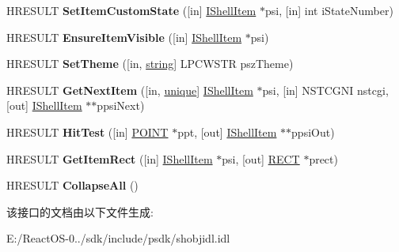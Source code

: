 \begin{DoxyCompactItemize}
\item 
\mbox{\label{interface_i_name_space_tree_control_a7b407539cedfba7dcdef18b0580801e9}} 
H\+R\+E\+S\+U\+LT {\bfseries Set\+Item\+Custom\+State} (\mbox{[}in\mbox{]} \hyperlink{interface_i_shell_item}{I\+Shell\+Item} $\ast$psi, \mbox{[}in\mbox{]} int i\+State\+Number)
\item 
\mbox{\label{interface_i_name_space_tree_control_a92fd1a0ce5f82459c0abe6a3a7b8f928}} 
H\+R\+E\+S\+U\+LT {\bfseries Ensure\+Item\+Visible} (\mbox{[}in\mbox{]} \hyperlink{interface_i_shell_item}{I\+Shell\+Item} $\ast$psi)
\item 
\mbox{\label{interface_i_name_space_tree_control_a00c821700f0ced829b4efab13bb7a442}} 
H\+R\+E\+S\+U\+LT {\bfseries Set\+Theme} (\mbox{[}in, \hyperlink{structstring}{string}\mbox{]} L\+P\+C\+W\+S\+TR psz\+Theme)
\item 
\mbox{\label{interface_i_name_space_tree_control_ad71c0f60cacccd7dec8f88dcf53eaa60}} 
H\+R\+E\+S\+U\+LT {\bfseries Get\+Next\+Item} (\mbox{[}in, \hyperlink{interfaceunique}{unique}\mbox{]} \hyperlink{interface_i_shell_item}{I\+Shell\+Item} $\ast$psi, \mbox{[}in\mbox{]} N\+S\+T\+C\+G\+NI nstcgi, \mbox{[}out\mbox{]} \hyperlink{interface_i_shell_item}{I\+Shell\+Item} $\ast$$\ast$ppsi\+Next)
\item 
\mbox{\label{interface_i_name_space_tree_control_ab09cfaf7016e1fdcd4a8ddcb13549e12}} 
H\+R\+E\+S\+U\+LT {\bfseries Hit\+Test} (\mbox{[}in\mbox{]} \hyperlink{structtag_p_o_i_n_t}{P\+O\+I\+NT} $\ast$ppt, \mbox{[}out\mbox{]} \hyperlink{interface_i_shell_item}{I\+Shell\+Item} $\ast$$\ast$ppsi\+Out)
\item 
\mbox{\label{interface_i_name_space_tree_control_a0fb8d856ce2b86ee4608c8629473d05f}} 
H\+R\+E\+S\+U\+LT {\bfseries Get\+Item\+Rect} (\mbox{[}in\mbox{]} \hyperlink{interface_i_shell_item}{I\+Shell\+Item} $\ast$psi, \mbox{[}out\mbox{]} \hyperlink{structtag_r_e_c_t}{R\+E\+CT} $\ast$prect)
\item 
\mbox{\label{interface_i_name_space_tree_control_a78fa1be38d45ab12bc72f7990b2c791d}} 
H\+R\+E\+S\+U\+LT {\bfseries Collapse\+All} ()
\end{DoxyCompactItemize}


该接口的文档由以下文件生成\+:\begin{DoxyCompactItemize}
\item 
E\+:/\+React\+O\+S-\/0../sdk/include/psdk/shobjidl.\+idl\end{DoxyCompactItemize}
